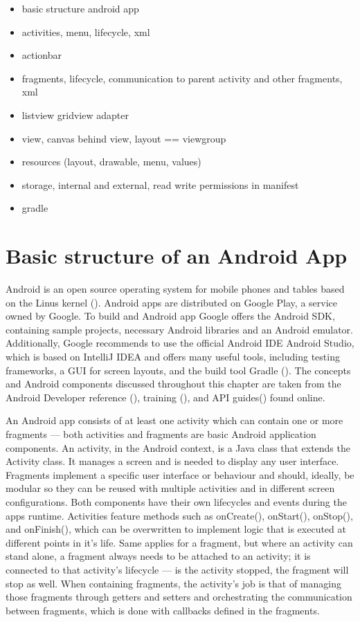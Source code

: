 \begin{itemize}
\item basic structure android app
\item activities, menu, lifecycle, xml
\item actionbar
\item fragments, lifecycle, communication to parent activity and other fragments, xml
\item listview gridview adapter
\item view, canvas behind view, layout == viewgroup
\item resources (layout, drawable, menu, values)
\item storage, internal and external, read write permissions in manifest
\item gradle
\end{itemize}

\section{Basic structure of an Android App}
Android is an open source operating system for mobile phones and tables based on the Linus kernel (\cite{androiddef}). Android apps are distributed on Google Play, a service owned by Google. To build and Android app Google offers the Android \gls{SDK}, containing sample projects, necessary Android libraries and an Android emulator. Additionally, Google recommends to use the official Android \gls{IDE} Android Studio, which is based on IntelliJ IDEA and offers many useful tools, including testing frameworks, a \gls{GUI} for screen layouts, and the build tool Gradle (\cite{androidstudio}). The concepts and Android components discussed throughout this chapter are taken from the Android Developer reference (\cite{androidreference}), training (\cite{androidtraining}), and \gls{API} guides(\cite{androidguides}) found online.

An Android app consists of  at least one activity which can contain one or more fragments --- both activities and fragments are basic Android application components. An activity, in the Android context, is a Java class that extends the Activity class. It manages a screen and is needed to display any user interface. Fragments implement a specific user interface or behaviour and should, ideally, be modular so they can be reused with multiple activities and in different screen configurations. Both components have their own lifecycles and events during the apps runtime. Activities feature methods such as onCreate(), onStart(), onStop(), and onFinish(), which can be overwritten to implement logic that is executed at different points in it’s life. Same applies for a fragment, but where an activity can stand alone, a fragment always needs to be attached to an activity; it is connected to that activity's lifecycle --- is the activity stopped, the fragment will stop as well.
When containing fragments, the activity’s job is that of managing those fragments through getters and setters and orchestrating the communication between fragments, which is done with callbacks defined in the fragments.


